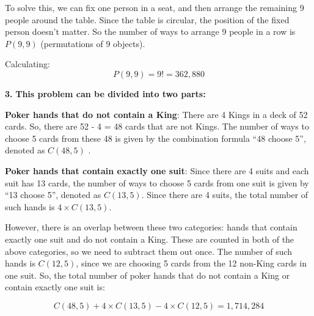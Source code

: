 \documentclass{article}
\begin{document}
To solve this, we can fix one person in a seat, and then arrange the remaining 9 people around the table. Since the table is circular, the position of the fixed person doesn't matter.
So the number of ways to arrange 9 people in a row is \( P(9, 9) \) (permutations of 9 objects).

Calculating:
\[ P(9, 9) = 9! = 362,880 \]

\textbf{3.}
\textbf{This problem can be divided into two parts:}

\textbf{Poker hands that do not contain a King}: There are 4 Kings in a deck of 52 cards. So, there are 52 - 4 = 48 cards that are not Kings. The number of ways to choose 5 cards from these 48 is given by the combination formula “48 choose 5”, 
denoted as $C(48, 5)$ .


\textbf{Poker hands that contain exactly one suit}: Since there are 4 suits and each suit has 13 cards, the number of ways to choose 5 cards from one suit is given by “13 choose 5”, denoted as $C(13, 5)$. Since there are 4 suits, the total number of such hands is 
$4 \times C(13, 5)$.


However, there is an overlap between these two categories: hands that contain exactly one suit and do not contain a King. These are counted in both of the above categories, so we need to subtract them out once. The number of such hands is $C(12, 5)$, since we are choosing 5 cards from the 12 non-King cards in one suit.
So, the total number of poker hands that do not contain a King or contain exactly one suit is:

\[ C(48, 5) + 4 \times C(13, 5) - 4 \times C(12, 5) = 1,714,284 \]
\end{document}
